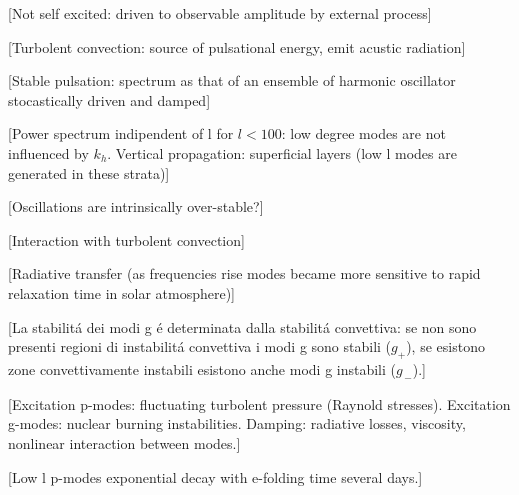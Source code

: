 \documentclass[../main.tex]{subfiles}
\begin{document}
[Not self excited: driven to observable amplitude by external process]

[Turbolent convection: source of pulsational energy, emit acustic radiation]

[Stable pulsation: spectrum as that of an ensemble of harmonic oscillator stocastically driven and damped]

[Power spectrum indipendent of l for $l<100$: low degree modes are not influenced by $k_h$. Vertical propagation: superficial layers (low l modes are generated in these strata)]

[Oscillations are intrinsically over-stable?]

[Interaction with turbolent convection]

[Radiative transfer (as frequencies rise modes became more sensitive to rapid relaxation time in solar atmosphere)]

[La stabilit\'a dei modi g \'e determinata dalla stabilit\'a convettiva: se non sono presenti regioni di instabilit\'a convettiva i modi g sono stabili ($g_+$), se esistono zone convettivamente instabili esistono anche modi g instabili ($g_{\,-}$).]

[Excitation p-modes: fluctuating turbolent pressure (Raynold stresses). Excitation g-modes: nuclear burning instabilities. Damping: radiative losses, viscosity, nonlinear interaction between modes.]

[Low l p-modes exponential decay with e-folding time several days.]
\end{document}
